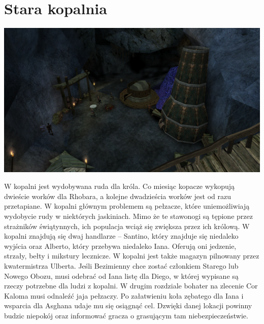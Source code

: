 \documentclass[11pt,polish, openany]{book}
\begin{document}
\section{Stara kopalnia}
\begin{center}
	\includegraphics[scale=0.25]{twojastara-kopalnia}
\end{center}
W kopalni jest wydobywana ruda dla króla. Co miesiąc kopacze wykopują dwieście worków dla Rhobara, a kolejne dwadzieścia worków jest od razu przetapiane. W kopalni głównym problemem są pełzacze, które uniemożliwiają wydobycie rudy w niektórych jaskiniach. Mimo że te stawonogi są tępione przez strażników świątynnych, ich populacja wciąż się zwiększa przez ich królową. W kopalni znajdują się dwaj handlarze – Santino, który znajduje się niedaleko wyjścia oraz Alberto, który przebywa niedaleko Iana. Oferują oni jedzenie, strzały, bełty i mikstury lecznicze. W kopalni jest także magazyn pilnowany przez kwatermistrza Ulberta. Jeśli Bezimienny chce zostać członkiem Starego lub Nowego Obozu, musi odebrać od Iana listę dla Diego, w której wypisane są rzeczy potrzebne dla ludzi z kopalni. W drugim rozdziale bohater na zlecenie Cor Kaloma musi odnaleźć jaja pełzaczy. Po załatwieniu koła zębatego dla Iana i wsparcia dla Asghana udaje mu się osiągnąć cel.
Dzwięki danej lokacji powinny budzic niepokój oraz informować gracza o grasującym tam niebezpieczeństwie.
\end{document}
